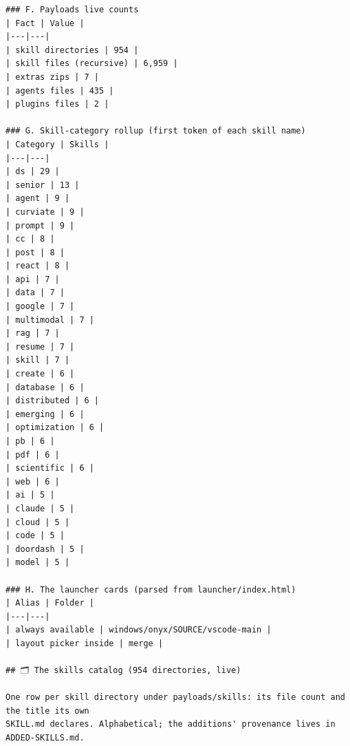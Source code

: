 \begin{Verbatim}[breaklines,breakanywhere,fontsize=\footnotesize]
### F. Payloads live counts
| Fact | Value |
|---|---|
| skill directories | 954 |
| skill files (recursive) | 6,959 |
| extras zips | 7 |
| agents files | 435 |
| plugins files | 2 |

### G. Skill-category rollup (first token of each skill name)
| Category | Skills |
|---|---|
| ds | 29 |
| senior | 13 |
| agent | 9 |
| curviate | 9 |
| prompt | 9 |
| cc | 8 |
| post | 8 |
| react | 8 |
| api | 7 |
| data | 7 |
| google | 7 |
| multimodal | 7 |
| rag | 7 |
| resume | 7 |
| skill | 7 |
| create | 6 |
| database | 6 |
| distributed | 6 |
| emerging | 6 |
| optimization | 6 |
| pb | 6 |
| pdf | 6 |
| scientific | 6 |
| web | 6 |
| ai | 5 |
| claude | 5 |
| cloud | 5 |
| code | 5 |
| doordash | 5 |
| model | 5 |

### H. The launcher cards (parsed from launcher/index.html)
| Alias | Folder |
|---|---|
| always available | windows/onyx/SOURCE/vscode-main |
| layout picker inside | merge |

## 🗂️ The skills catalog (954 directories, live)

One row per skill directory under payloads/skills: its file count and the title its own
SKILL.md declares. Alphabetical; the additions' provenance lives in ADDED-SKILLS.md.


\end{Verbatim}
